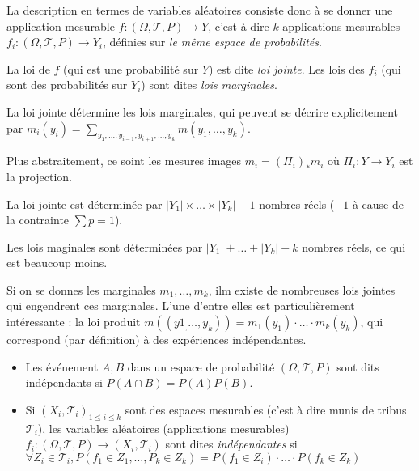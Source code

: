 \documentclass[10pt,a4paper,notitlepage ]{report}
\begin{document}
La description en termes de variables aléatoires consiste donc à se donner une application mesurable $f : (\Omega, \mathcal T, P) \rightarrow Y$, c'est à dire $k$ applications mesurables $f_i : (\Omega, \mathcal T, P) \rightarrow Y_i$, définies sur \emph{le même espace de probabilités}.

\begin{definition}
	La loi de $f$ (qui est une probabilité sur $Y$) est dite \emph{loi jointe}. Les lois des $f_i$ (qui sont des probabilités sur $Y_i$) sont dites \emph{lois marginales}.
\end{definition}

\begin{rem}
	La loi jointe détermine les lois marginales, qui peuvent se décrire explicitement par $m_i(y_i)=\underset{y_1,\dots,y_{i-1},y_{i+1},\dots,y_k}{\sum} m(y_1,\dots,y_k)$.
	
	Plus abstraitement, ce soint les mesures images $m_i=(\Pi_i)_*m_i$ où $\Pi_i : Y \rightarrow Y_i$ est la projection.
\end{rem}

\begin{rem}
	La loi jointe est déterminée par $|Y_1|\times\dots\times |Y_k| - 1$ nombres réels ($-1$ à cause de la contrainte $\sum p = 1$).
	
	Les lois maginales sont déterminées par $|Y_1| + \dots + |Y_k| - k$ nombres réels, ce qui est beaucoup moins.
\end{rem}

Si on se donnes les marginales $m_1, \dots, m_k$, ilm existe de nombreuses lois jointes qui engendrent ces marginales. L'une d'entre elles est particulièrement intéressante : la loi produit $m((y1_,\dots,y_k))=m_1(y_1) \cdot \dots \cdot m_k(y_k)$, qui correspond (par définition) à des expériences indépendantes.

\begin{definition}
	\begin{itemize}
		\item Les événement $A,B$ dans un espace de probabilité $(\Omega,\mathcal T, P)$ sont dits indépendants si $P(A\cap B) = P(A)P(B)$.
		\item Si $(X_i, \mathcal T_i)_{1\le i\le k}$ sont des espaces mesurables (c'est à dire munis de tribus $\mathcal T_i$), les variables aléatoires (applications mesurables) $f_i : (\Omega,\mathcal T, P) \rightarrow (X_i,\mathcal T_i)$ sont dites \emph{indépendantes} si $\forall Z_i \in \mathcal T_i, P(f_1\in Z_1, \dots, P_k \in Z_k) = P(f_1 \in Z_i) \cdot \dots \cdot P(f_k \in Z_k)$
	\end{itemize}
\end{definition}
\end{document}
